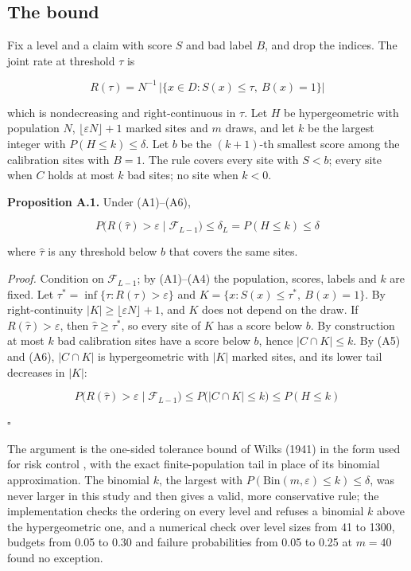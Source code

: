 \documentclass{iopjournal}
\begin{document}
\hypertarget{the-bound}{%
\subsection{The bound}\label{the-bound}}

Fix a level and a claim with score \(S\) and bad label \(B\), and drop the indices. The joint rate at threshold \(\tau\) is

\[
R(\tau) = N^{-1} \, \lvert \{x \in D : S(x) \le \tau,\ B(x) = 1\} \rvert
\]

which is nondecreasing and right-continuous in \(\tau\). Let \(H\) be hypergeometric with population \(N\), \(\lfloor \varepsilon N \rfloor + 1\) marked sites and \(m\) draws, and let \(k\) be the largest integer with \(P(H \le k) \le \delta\). Let \(b\) be the \((k+1)\)-th smallest score among the calibration sites with \(B = 1\). The rule covers every site with \(S < b\); every site when \(C\) holds at most \(k\) bad sites; no site when \(k < 0\).

\textbf{Proposition A.1.} Under (A1)--(A6),

\[
P\big(R(\hat\tau) > \varepsilon \mid \mathcal{F}_{L-1}\big) \le \delta_L = P(H \le k) \le \delta
\]

where \(\hat\tau\) is any threshold below \(b\) that covers the same sites.

\emph{Proof.} Condition on \(\mathcal{F}_{L-1}\); by (A1)--(A4) the population, scores, labels and \(k\) are fixed. Let \(\tau^\ast = \inf\{\tau : R(\tau) > \varepsilon\}\) and \(K = \{x : S(x) \le \tau^\ast,\ B(x) = 1\}\). By right-continuity \(|K| \ge \lfloor \varepsilon N \rfloor + 1\), and \(K\) does not depend on the draw. If \(R(\hat\tau) > \varepsilon\), then \(\hat\tau \ge \tau^\ast\), so every site of \(K\) has a score below \(b\). By construction at most \(k\) bad calibration sites have a score below \(b\), hence \(|C \cap K| \le k\). By (A5) and (A6), \(|C \cap K|\) is hypergeometric with \(|K|\) marked sites, and its lower tail decreases in \(|K|\):

\[
P\big(R(\hat\tau) > \varepsilon \mid \mathcal{F}_{L-1}\big) \le P\big(|C \cap K| \le k\big) \le P(H \le k)
\]

\(\square\)

The argument is the one-sided tolerance bound of Wilks (1941) in the form used for risk control \cite{Bates2021,Angelopoulos2025}, with the exact finite-population tail in place of its binomial approximation. The binomial \(k\), the largest with \(P(\mathrm{Bin}(m, \varepsilon) \le k) \le \delta\), was never larger in this study and then gives a valid, more conservative rule; the implementation checks the ordering on every level and refuses a binomial \(k\) above the hypergeometric one, and a numerical check over level sizes from 41 to 1300, budgets from 0.05 to 0.30 and failure probabilities from 0.05 to 0.25 at \(m = 40\) found no exception.
\end{document}
